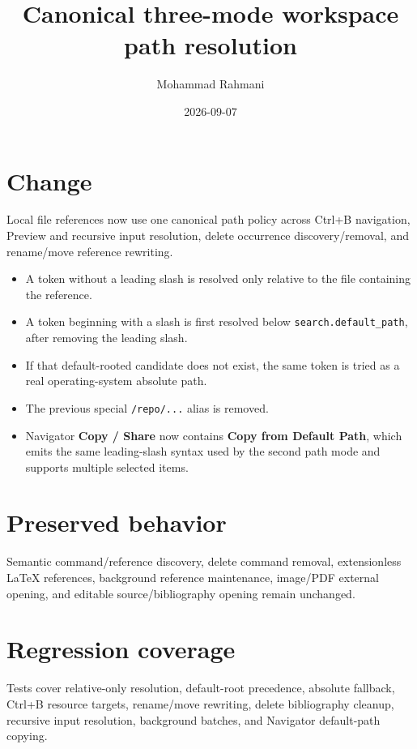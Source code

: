 \documentclass[a4paper]{article}
\title{Canonical three-mode workspace path resolution}
\date{2026-09-07}
\author{Mohammad Rahmani}
\begin{document}
\maketitle

\section{Change}
Local file references now use one canonical path policy across Ctrl+B
navigation, Preview and recursive input resolution, delete occurrence
discovery/removal, and rename/move reference rewriting.

\begin{itemize}
   \item A token without a leading slash is resolved only relative to the file
   containing the reference.
   \item A token beginning with a slash is first resolved below
   \texttt{search.default\_path}, after removing the leading slash.
   \item If that default-rooted candidate does not exist, the same token is
   tried as a real operating-system absolute path.
   \item The previous special \texttt{/repo/...} alias is removed.
   \item Navigator \textbf{Copy / Share} now contains
   \textbf{Copy from Default Path}, which emits the same leading-slash syntax
   used by the second path mode and supports multiple selected items.
\end{itemize}

\section{Preserved behavior}
Semantic command/reference discovery, delete command removal, extensionless
LaTeX references, background reference maintenance, image/PDF external
opening, and editable source/bibliography opening remain unchanged.

\section{Regression coverage}
Tests cover relative-only resolution, default-root precedence, absolute
fallback, Ctrl+B resource targets, rename/move rewriting, delete bibliography
cleanup, recursive input resolution, background batches, and Navigator
default-path copying.
\end{document}
